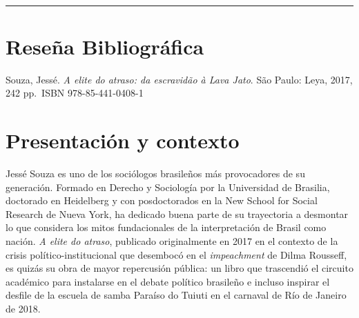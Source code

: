 \documentclass{article}
\begin{document}
\begin{textblock*}{68mm}
{\begin{minipage}[t]{68mm}
{\href{https://www.facebook.com/sharer/sharer.php?u=https%3A%2F%2Fwww.google.com%2F}{}~
\href{https://www.linkedin.com/sharing/share-offsite/?url=https%3A%2F%2Fwww.google.com%2F}{}~
\href{https://www.reddit.com/submit?url=https%3A%2F%2Fwww.google.com%2F&title=Rese%C3%B1a%20bibliogr%C3%A1fica}{}~
\href{https://www.researchgate.net/search?q=Rese%C3%B1a%20bibliogr%C3%A1fica}{}~
\href{https://t.me/share/url?url=https%3A%2F%2Fwww.google.com%2F&text=Rese%C3%B1a%20bibliogr%C3%A1fica}{}~
\href{https://wa.me/?text=https%3A%2F%2Fwww.google.com%2F}{}~
\href{https://twitter.com/intent/tweet?url=https%3A%2F%2Fwww.google.com%2F&text=Rese%C3%B1a%20bibliogr%C3%A1fica}{}
}\par
\end{minipage}%
}%
\end{textblock*}


\bigskip
\noindent\rule{\linewidth}{0.4pt}
\bigskip

\section{Reseña Bibliográfica}
Souza, Jessé. \textit{A elite do atraso: da escravidão à Lava Jato}. São Paulo: Leya, 2017, 242 pp. ISBN 978-85-441-0408-1


\section{Presentación y contexto}
Jessé Souza es uno de los sociólogos brasileños más provocadores de su generación. Formado en Derecho y Sociología por la Universidad de Brasilia, doctorado en Heidelberg y con posdoctorados en la New School for Social Research de Nueva York, ha dedicado buena parte de su trayectoria a desmontar lo que considera los mitos fundacionales de la interpretación de Brasil como nación. \textit{A elite do atraso}, publicado originalmente en 2017 en el contexto de la crisis político-institucional que desembocó en el \textit{impeachment} de Dilma Rousseff, es quizás su obra de mayor repercusión pública: un libro que trascendió el circuito académico para instalarse en el debate político brasileño e incluso inspirar el desfile de la escuela de samba Paraíso do Tuiuti en el carnaval de Río de Janeiro de 2018.
\end{document}
